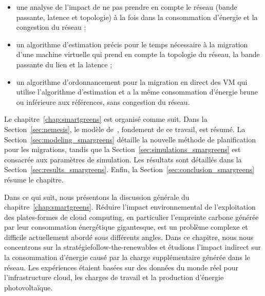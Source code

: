 \begin{itemize}
    \item une analyse de l'impact de ne pas prendre en compte le réseau (bande passante, latence et topologie) à la fois dans la consommation d'énergie et la congestion du réseau ;
    \item un algorithme d'estimation précis pour le temps nécessaire à la migration d'une machine virtuelle qui prend en compte la topologie du réseau, la bande passante du lien et la latence ;
    \item un algorithme d'ordonnancement pour la migration en direct des VM qui utilise l'algorithme d'estimation et a la même consommation d'énergie brune ou inférieure aux références, sans congestion du réseau.
\end{itemize}
    
Le chapitre~\ref{chap:smartgreens} est organisé comme suit. Dans la Section~\ref{sec:nemesis}, le modèle de~\citet{NEMESIS}, fondement de ce travail, est résumé. La Section~\ref{sec:modeling_smargreens} détaille la nouvelle méthode de planification pour les migrations, tandis que la Section~\ref{sec:simulations_smargreens} est consacrée aux paramètres de simulation. Les résultats sont détaillés dans la Section~\ref{sec:results_smargreens}. Enfin, la Section~\ref{sec:conclusion_smargreens} résume le chapitre.

Dans ce qui suit, nous présentons la discussion générale du chapitre~\ref{chap:smartgreens}. Réduire l'impact environnemental de l'exploitation des plates-formes de cloud computing, en particulier l'empreinte carbone générée par leur consommation énergétique gigantesque, est un problème complexe et difficile actuellement abordé sous différents angles. Dans ce chapitre, nous nous concentrons sur la stratégiefollow-the-renewables et étudions l'impact indirect sur la consommation d'énergie causé par la charge supplémentaire générée dans le réseau. Les expériences étaient basées sur des données du monde réel pour l'infrastructure cloud, les charges de travail et la production d'énergie photovoltaïque.

